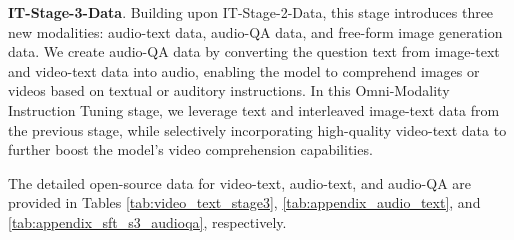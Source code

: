 
\textbf{IT-Stage-3-Data}.
Building upon IT-Stage-2-Data, this stage introduces three new modalities: audio-text data, audio-QA data, and free-form image generation data. We create audio-QA data by converting the question text from image-text and video-text data into audio, enabling the model to comprehend images or videos based on textual or auditory instructions. In this Omni-Modality Instruction Tuning stage, we leverage text and interleaved image-text data from the previous stage, while selectively incorporating high-quality video-text data to further boost the model's video comprehension capabilities.

The detailed open-source data for video-text, audio-text, and audio-QA are provided in Tables \ref{tab:video_text_stage3}, \ref{tab:appendix_audio_text}, and \ref{tab:appendix_sft_s3_audioqa}, respectively.






